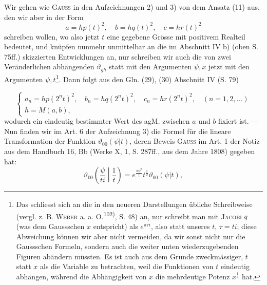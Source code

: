 Wir gehen wie \textsc{Gauss} in den Aufzeichnungen 2) und 3) von dem Ansatz
(11) aus, den wir aber in der Form
\begingroup\makeatletter\tagsleft@true\let\veqno\leqno\makeatother
\begin{equation*}
a=hp(t)^2,\quad b=hq(t)^2,\quad c=hr(t)^2\tag{11\,a}
\end{equation*}
\endgroup
\noindent schreiben wollen, wo also jetzt \(t\) eine gegebene Grösse mit positivem Realteil
bedeutet, und knüpfen nunmehr unmittelbar an die im Abschnitt IV b) (oben
S. 75ff.) skizzierten Entwicklungen an, nur schreiben wir auch die von zwei
Veränderlichen abhängenden \(\vartheta_{gh}\) statt mit den Argumenten \(\psi,x\) jetzt mit den
Argumenten \(\psi,t\)\footnote{Das schliesst sich an die in den neueren Darstellungen übliche Schreibweise (vergl. z. B. \textsc{Weber} a. a. O.\textsuperscript{102)}, S. 48) an, nur schreibt man mit \textsc{Jacobi} \(q\) (was dem Gaussschen \(x\) entspricht) als \(e^{\pi\tau i}\), also statt unseres \(t\), \(\tau=ti\); diese Abweichung können wir aber nicht vermeiden, da wir sonst nicht nur die Gaussschen Formeln, sondern auch die weiter unten wiederzugebenden Figuren abändern müssten. Es ist auch aus dem Grunde zweckmässiger, \(t\) statt \(x\) als die Variable zu betrachten, weil die Funktionen von \(t\) eindeutig abhängen, während die Abhängigkeit von \(x\) die mehrdeutige Potenz \(x^{\frac14}\) hat.}. Dann folgt aus den Gln. (29), (30) Abschnitt IV (S. 79)\par
\clearpage{}
\begingroup\makeatletter\tagsleft@true\let\veqno\leqno\makeatother
\begin{equation*}
\left\{\begin{gathered}
a_n=hp(2^nt)^2,\quad b_n=hq(2^nt)^2,\quad c_n=hr(2^nt)^2,\quad(n=1,2,\ldots)\\
h=M(a,b),
\end{gathered}\right.\tag{14}
\end{equation*}
\endgroup
\noindent wodurch ein eindeutig bestimmter Wert des agM. zwischen \(a\) und \(b\) fixiert
ist. — Nun finden wir im Art. 6 der Aufzeichnung 3) die Formel für die
lineare Transformation der Funktion \(\vartheta_{00}(\psi|t)\), deren Beweis \textsc{Gauss} im Art. 1
der Notiz aus dem Handbuch 16, Bb (Werke X, 1, S. 287ff., aus dem Jahre
1808) gegeben hat:
\begingroup\makeatletter\tagsleft@true\let\veqno\leqno\makeatother
\begin{equation*}
\vartheta_{00}\left(\frac\psi{ti}\middle|\frac1t\right)=e^{\frac{\pi\psi^2}t}t^{\frac12}\vartheta_{00}(\psi|t),\tag{15}
\end{equation*}
